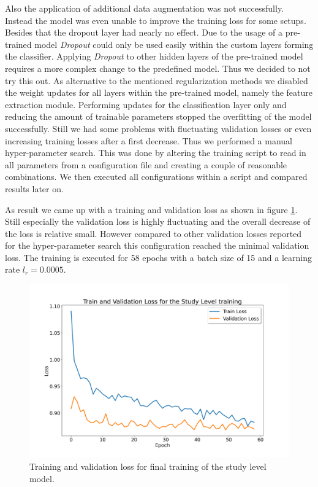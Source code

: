 Also the application of additional data augmentation was not successfully. Instead the model was even unable to improve the training loss for some setups. Besides that the dropout layer had nearly no effect. Due to the usage of a pre-trained model \textit{Dropout} could only be used easily within the custom layers forming the classifier. Applying \textit{Dropout} to other hidden layers of the pre-trained model requires a more complex change to the predefined model. Thus we decided to not try this out.
As alternative to the mentioned regularization methods we disabled the weight updates for all layers within the pre-trained model, namely the feature extraction module. Performing updates for the classification layer only and reducing the amount of trainable parameters stopped the overfitting of the model successfully. Still we had some problems with fluctuating validation losses or even increasing training losses after a first decrease. Thus we performed a manual hyper-parameter search. This was done by altering the training script to read in all parameters from a configuration file and creating a couple of reasonable combinations. We then executed all configurations within a script and compared results later on.

As result we came up with a training and validation loss as shown in figure \ref{fig:study-loss}. Still especially the validation loss is highly fluctuating and the overall decrease of the loss is relative small. However compared to other validation losses reported for the hyper-parameter search this configuration reached the minimal validation loss. The training is executed for 58 epochs with a batch size of 15 and a learning rate $l_r = 0.0005$.

\begin{figure}
	\centering
	\includegraphics[width=.7\linewidth]{img/loss_study_level_ep58.png}
	\caption{Training and validation loss for final training of the study level model.}
	\label{fig:study-loss}
\end{figure}
